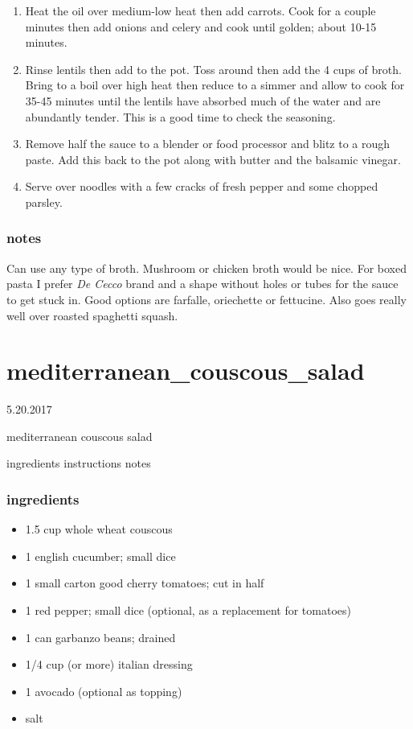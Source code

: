 \documentclass[]{book}
\providecommand{\tightlist}{%
  \setlength{\itemsep}{0pt}\setlength{\parskip}{0pt}}
\begin{document}
\begin{enumerate}
\def\labelenumi{\arabic{enumi}.}
\tightlist
\item
  Heat the oil over medium-low heat then add carrots. Cook for a couple minutes then add onions and celery and cook
  until golden; about 10-15 minutes.
\item
  Rinse lentils then add to the pot. Toss around then add the 4 cups of broth. Bring to a boil over high heat then
  reduce to a simmer and
  allow to cook for 35-45 minutes until the lentils have absorbed much of the water and are abundantly tender. This is a
  good time to check the seasoning.
\item
  Remove half the sauce to a blender or food processor and blitz to a rough paste. Add this back to the pot along with
  butter and the balsamic vinegar.
\item
  Serve over noodles with a few cracks of fresh pepper and some chopped parsley.
\end{enumerate}

\hypertarget{notes-2}{%
\subsection{notes}\label{notes-2}}

Can use any type of broth. Mushroom or chicken broth would be nice. For boxed pasta I prefer \emph{De Cecco} brand and a
shape without holes or tubes for the sauce to get stuck in. Good options are farfalle, oriechette or fettucine. Also
goes really well over roasted spaghetti squash.

\hypertarget{mediterranean_couscous_salad}{%
\chapter{mediterranean\_couscous\_salad}\label{mediterranean_couscous_salad}}

5.20.2017

mediterranean couscous salad

ingredients \textbar{}
instructions \textbar{}
notes

\hypertarget{ingredients-3}{%
\subsection{ingredients}\label{ingredients-3}}

\begin{itemize}
\tightlist
\item
  1.5 cup whole wheat couscous
\item
  1 english cucumber; small dice
\item
  1 small carton good cherry tomatoes; cut in half
\item
  1 red pepper; small dice (optional, as a replacement for tomatoes)
\item
  1 can garbanzo beans; drained
\item
  1/4 cup (or more) italian dressing
\item
  1 avocado (optional as topping)
\item
  salt
\end{itemize}
\end{document}
